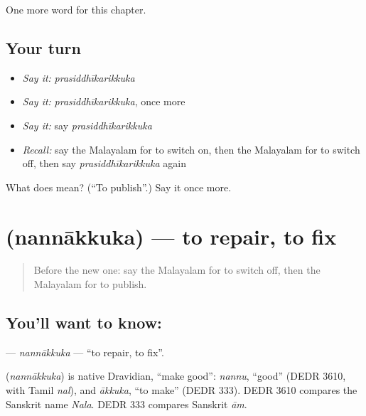 \begin{grammarlens}[title={What you've built}]
One more word for this chapter.
\end{grammarlens}

\subsection*{Your turn}
\begin{itemize}
\raggedright
  \item \emph{Say it:} \emph{prasiddhīkarikkuka}
  \item \emph{Say it:} \emph{prasiddhīkarikkuka}, once more
  \item \emph{Say it:} say \emph{prasiddhīkarikkuka}
  \item \emph{Recall:} say the Malayalam for to switch on, then the Malayalam for to switch off, then say \emph{prasiddhīkarikkuka} again
\end{itemize}

\begin{tcolorbox}[breakable,colback=teal!4,colframe=teal!35!black,title={Before you move on}]
What does  mean? (\textquotedblleft{}To publish\textquotedblright{}.) Say it once more.
\end{tcolorbox}
\section[\texorpdfstring{\ml{നന്നാക്കുക} (nannākkuka)}{നന്നാക്കുക (nannākkuka)}]{ (nannākkuka) — to repair, to fix}

\label{lesson:ML-C188-nannakkuka}



\begin{quote}
Before the new one: say the Malayalam for to switch off, then the Malayalam for to publish.
\end{quote}

\subsection*{You'll want to know: }
\textbf{} — \emph{nannākkuka} — \textquotedblleft{}to repair, to fix\textquotedblright{}.

\begin{cousinweb}
\textbf{} (\emph{nannākkuka}) is native Dravidian, \textquotedblleft{}make good\textquotedblright{}: \emph{nannu}, \textquotedblleft{}good\textquotedblright{} (DEDR 3610, with Tamil \emph{nal}), and \emph{ākkuka}, \textquotedblleft{}to make\textquotedblright{} (DEDR 333). DEDR 3610 compares the Sanskrit name \emph{Nala}. DEDR 333 compares Sanskrit \emph{ām}.
\end{cousinweb}

